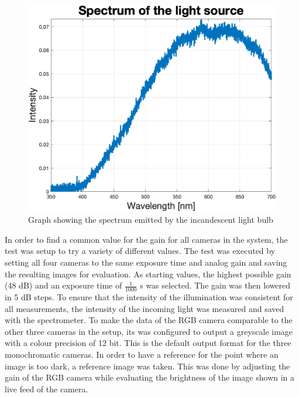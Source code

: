 \begin{figure}
\begin{center}
\includegraphics[width=12cm]{Pictures/AMOLEDSpectrum}
\caption[Graph showing the spectrum emitted by the incandescent light bulb]{Graph showing the spectrum emitted by the incandescent light bulb}
\label{AMOLEDSpectrum}
\end{center}
\end{figure}

In order to find a common value for the gain for all cameras in the system, the test was setup to try a variety of different values. The test was executed by setting all four cameras to the same exposure time and analog gain and saving the resulting images for evaluation. As starting values, the highest possible gain (48 dB) and an exposure time of $\frac{1}{1000}$ s was selected. The gain was then lowered in 5 dB steps. To ensure that the intensity of the illumination was consistent for all measurements, the intensity of the incoming light was measured and saved with the spectrometer. To make the data of the RGB camera comparable to the other three cameras in the setup, its was configured to output a greyscale image with a colour precision of 12 bit. This is the default output format for the three monochromatic cameras. In order to have a reference for the point where an image is too dark, a reference image was taken. This was done by adjusting the gain of the RGB camera while evaluating the brightness of the image shown in a live feed of the camera.


